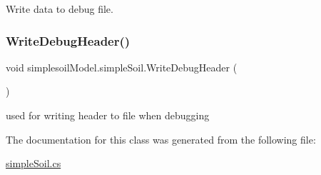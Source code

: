 Write data to debug file. 

\mbox{\label{classsimplesoil_model_1_1simple_soil_a2c3168847b685c0972abc43cb71be993}} 
\subsubsection{\texorpdfstring{WriteDebugHeader()}{WriteDebugHeader()}}
{\footnotesize\ttfamily void simplesoil\+Model.\+simple\+Soil.\+Write\+Debug\+Header (\begin{DoxyParamCaption}{ }\end{DoxyParamCaption})\hspace{0.3cm}{\ttfamily [inline]}}



used for writing header to file when debugging 



The documentation for this class was generated from the following file\+:\begin{DoxyCompactItemize}
\item 
\mbox{\hyperlink{simple_soil_8cs}{simple\+Soil.\+cs}}\end{DoxyCompactItemize}
